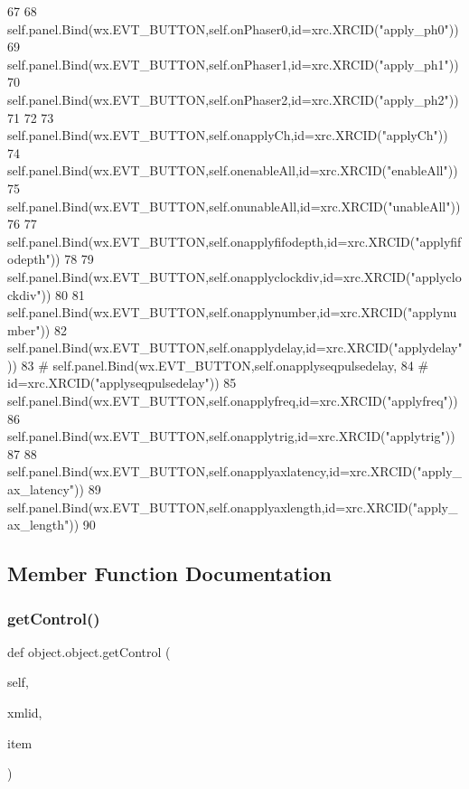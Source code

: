 \begin{DoxyCode}
67 
68         self.panel.Bind(wx.EVT\_BUTTON,self.onPhaser0,id=xrc.XRCID(\textcolor{stringliteral}{"apply\_ph0"}))
69         self.panel.Bind(wx.EVT\_BUTTON,self.onPhaser1,id=xrc.XRCID(\textcolor{stringliteral}{"apply\_ph1"}))
70         self.panel.Bind(wx.EVT\_BUTTON,self.onPhaser2,id=xrc.XRCID(\textcolor{stringliteral}{"apply\_ph2"}))
71 
72 
73         self.panel.Bind(wx.EVT\_BUTTON,self.onapplyCh,id=xrc.XRCID(\textcolor{stringliteral}{"applyCh"}))
74         self.panel.Bind(wx.EVT\_BUTTON,self.onenableAll,id=xrc.XRCID(\textcolor{stringliteral}{"enableAll"}))
75         self.panel.Bind(wx.EVT\_BUTTON,self.onunableAll,id=xrc.XRCID(\textcolor{stringliteral}{"unableAll"}))
76 
77         self.panel.Bind(wx.EVT\_BUTTON,self.onapplyfifodepth,id=xrc.XRCID(\textcolor{stringliteral}{"applyfifodepth"}))
78 
79         self.panel.Bind(wx.EVT\_BUTTON,self.onapplyclockdiv,id=xrc.XRCID(\textcolor{stringliteral}{"applyclockdiv"}))
80 
81         self.panel.Bind(wx.EVT\_BUTTON,self.onapplynumber,id=xrc.XRCID(\textcolor{stringliteral}{"applynumber"}))
82         self.panel.Bind(wx.EVT\_BUTTON,self.onapplydelay,id=xrc.XRCID(\textcolor{stringliteral}{"applydelay"}))
83 \textcolor{comment}{#        self.panel.Bind(wx.EVT\_BUTTON,self.onapplyseqpulsedelay,}
84 \textcolor{comment}{#                        id=xrc.XRCID("applyseqpulsedelay"))}
85         self.panel.Bind(wx.EVT\_BUTTON,self.onapplyfreq,id=xrc.XRCID(\textcolor{stringliteral}{"applyfreq"}))
86         self.panel.Bind(wx.EVT\_BUTTON,self.onapplytrig,id=xrc.XRCID(\textcolor{stringliteral}{"applytrig"}))
87 
88         self.panel.Bind(wx.EVT\_BUTTON,self.onapplyaxlatency,id=xrc.XRCID(\textcolor{stringliteral}{"apply\_ax\_latency"}))
89         self.panel.Bind(wx.EVT\_BUTTON,self.onapplyaxlength,id=xrc.XRCID(\textcolor{stringliteral}{"apply\_ax\_length"}))
90 
\end{DoxyCode}


\subsection{Member Function Documentation}
\mbox{\label{classobject_1_1object_a54a55487254a96ed2fe367439c41391f}} 
\subsubsection{\texorpdfstring{get\+Control()}{getControl()}\hspace{0.1cm}{\footnotesize\ttfamily [1/2]}}
{\footnotesize\ttfamily def object.\+object.\+get\+Control (\begin{DoxyParamCaption}\item[{}]{self,  }\item[{}]{xmlid,  }\item[{}]{item }\end{DoxyParamCaption})\hspace{0.3cm}{\ttfamily [inherited]}}

